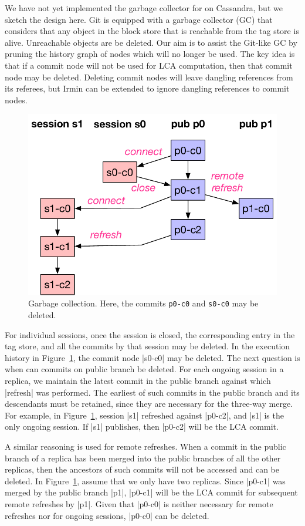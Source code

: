 We have not yet implemented the garbage collector for \name on Cassandra, but we
sketch the design here. Git is equipped with a garbage collector (GC) that
considers that any object in the block store that is reachable from the tag
store is alive. Unreachable objects are be deleted. Our aim is to assist the
Git-like GC by pruning the history graph of nodes which will no longer be used.
The key idea is that if a commit node will not be used for LCA computation,
then that commit node may be deleted. Deleting commit nodes will leave dangling
references from its referees, but Irmin can be extended to ignore
dangling references to commit nodes.

\begin{figure}
	\vspace{-1cm}
	\centering
	\includegraphics[scale=0.45]{figures/gc}
	\caption{Garbage collection. Here, the commits \texttt{p0-c0} and
		\texttt{s0-c0} may be deleted.}
	\label{fig:gc}
	\vspace{-0.7cm}
\end{figure}
For individual sessions, once the session is closed, the corresponding entry in
the tag store, and all the commits by that session may be deleted. In the
execution history in Figure~\ref{fig:gc}, the commit node |s0-c0| may be
deleted. The next question is when can commits on public branch be deleted. For
each ongoing session in a replica, we maintain the latest commit in the public
branch against which |refresh| was performed. The earliest of such commits in
the public branch and its descendants must be retained, since they are
necessary for the three-way merge. For example, in Figure~\ref{fig:gc}, session
|s1| refreshed against |p0-c2|, and |s1| is the only ongoing session. If |s1|
publishes, then |p0-c2| will be the LCA commit.

A similar reasoning is used for remote refreshes. When a commit in the public
branch of a replica has been merged into the public branches of all the other
replicas, then the ancestors of such commits will not be accessed and can be
deleted. In Figure~\ref{fig:gc}, assume that we only have two replicas. Since
|p0-c1| was merged by the public branch |p1|, |p0-c1| will be the LCA commit
for subsequent remote refreshes by |p1|. Given that |p0-c0| is neither
necessary for remote refreshes nor for ongoing sessions, |p0-c0| can be
deleted.
